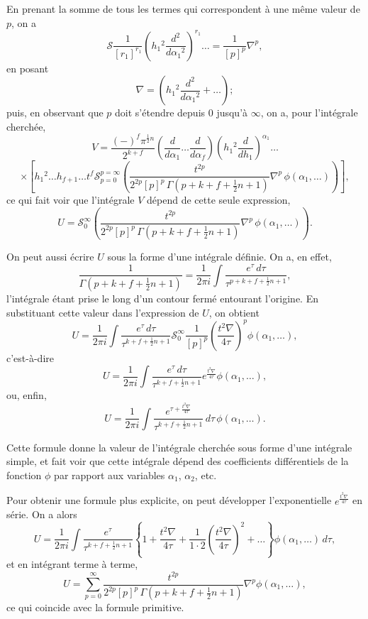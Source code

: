 \documentclass[11pt,a4paper]{book}
\begin{document}
\newpage
\setcounter{page}{199}

En prenant la somme de tous les termes qui correspondent \`{a} une m\^{e}me valeur
de $p$, on a
\[
\mathcal{S} \frac{1}{[r_1]^{r_1}} \left(h_1{}^{2} \frac{d^{2}}{d\alpha_1{}^{2}}\right)^{r_1} \ldots = \frac{1}{[p]^{p}} \nabla^{p},
\]
en posant
\[
\nabla = \left(h_1{}^{2} \frac{d^{2}}{d\alpha_1{}^{2}} + \ldots\right);
\]
puis, en observant que $p$ doit s'\'{e}tendre depuis $0$ jusqu'\`{a} $\infty$, on a, pour l'int\'{e}grale
cherch\'{e}e,
\[
V = \frac{(-)^f \pi^{\frac{1}{2}n}}{2^{k+f}} \left(\frac{d}{d\alpha_1} \ldots \frac{d}{d\alpha_f}\right) \left(h_1{}^{2} \frac{d}{dh_1}\right)^{\alpha_1} \ldots
\]
\[
\times \left[ h_1{}^{2} \ldots h_{f+1} \ldots t^{f} \mathcal{S}_{p=0}^{p=\infty} \left(\frac{t^{2p}}{2^{2p} [p]^{p} \, \Gamma\left(p + k + f + \tfrac{1}{2}n + 1\right)} \nabla^{p} \, \phi(\alpha_1, \ldots)\right)\right],
\]
ce qui fait voir que l'int\'{e}grale $V$ d\'{e}pend de cette seule expression,
\[
U = \mathcal{S}_{0}^{\infty} \left(\frac{t^{2p}}{2^{2p} [p]^{p} \, \Gamma\left(p + k + f + \tfrac{1}{2}n + 1\right)} \nabla^{p} \, \phi(\alpha_1, \ldots)\right).
\]

\newpage
\setcounter{page}{200}

On peut aussi \'{e}crire $U$ sous la forme d'une int\'{e}grale d\'{e}finie. On a, en effet,
\[
\frac{1}{\Gamma\left(p + k + f + \tfrac{1}{2}n + 1\right)} = \frac{1}{2\pi i} \int \frac{e^{\tau} \, d\tau}{\tau^{p+k+f+\frac{1}{2}n+1}},
\]
l'int\'{e}grale \'{e}tant prise le long d'un contour ferm\'{e} entourant l'origine. En substituant
cette valeur dans l'expression de $U$, on obtient
\[
U = \frac{1}{2\pi i} \int \frac{e^{\tau} \, d\tau}{\tau^{k+f+\frac{1}{2}n+1}} \mathcal{S}_{0}^{\infty} \frac{1}{[p]^{p}} \left(\frac{t^{2}\nabla}{4\tau}\right)^{p} \phi(\alpha_1, \ldots),
\]
c'est-\`{a}-dire
\[
U = \frac{1}{2\pi i} \int \frac{e^{\tau} \, d\tau}{\tau^{k+f+\frac{1}{2}n+1}} e^{\frac{t^{2}\nabla}{4\tau}} \phi(\alpha_1, \ldots),
\]
ou, enfin,
\[
U = \frac{1}{2\pi i} \int \frac{e^{\tau + \frac{t^{2}\nabla}{4\tau}}}{\tau^{k+f+\frac{1}{2}n+1}} \, d\tau \, \phi(\alpha_1, \ldots).
\]

\newpage
\setcounter{page}{201}

Cette formule donne la valeur de l'int\'{e}grale cherch\'{e}e sous forme d'une int\'{e}grale
simple, et fait voir que cette int\'{e}grale d\'{e}pend des coefficients diff\'{e}rentiels de la fonction
$\phi$ par rapport aux variables $\alpha_1$, $\alpha_2$, etc.

Pour obtenir une formule plus explicite, on peut d\'{e}velopper l'exponentielle
$e^{\frac{t^{2}\nabla}{4\tau}}$ en s\'{e}rie. On a alors
\[
U = \frac{1}{2\pi i} \int \frac{e^{\tau}}{\tau^{k+f+\frac{1}{2}n+1}} \left\{1 + \frac{t^{2}\nabla}{4\tau} + \frac{1}{1 \cdot 2} \left(\frac{t^{2}\nabla}{4\tau}\right)^{2} + \ldots\right\} \phi(\alpha_1, \ldots) \, d\tau,
\]
et en int\'{e}grant terme \`{a} terme,
\[
U = \sum_{p=0}^{\infty} \frac{t^{2p}}{2^{2p} [p]^{p} \, \Gamma\left(p + k + f + \tfrac{1}{2}n + 1\right)} \nabla^{p} \phi(\alpha_1, \ldots),
\]
ce qui coincide avec la formule primitive.
\end{document}

